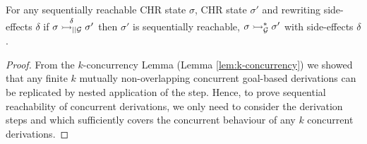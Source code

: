 \documentclass{tlp}
\begin{document}
For any sequentially reachable CHR state $\sigma$, CHR state $\sigma'$ and rewriting
side-effects $\delta$ if $\sigma \stackrel{\delta}{\rightarrowtail_{\mid\mid\cal G}} \sigma'$ then $\sigma'$ is 
sequentially reachable, $\sigma \rightarrowtail^*_{\cal G} \sigma'$ with side-effects $\delta$.

\begin{proof}
From the $k$-concurrency Lemma (Lemma \ref{lem:k-concurrency}) we showed that any finite 
$k$ mutually non-overlapping concurrent goal-based derivations can be replicated by nested 
application of the  step. Hence, to prove sequential reachability of 
concurrent derivations, we only need to consider the derivation steps  and 
 which sufficiently covers the concurrent behaviour of any $k$ 
concurrent derivations. 


\end{proof}
\end{document}
